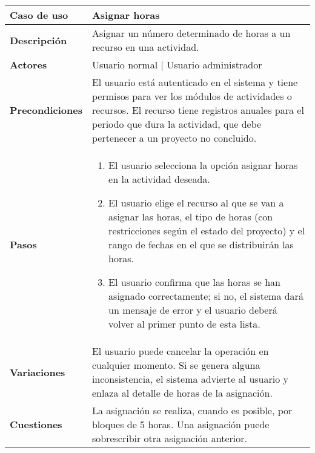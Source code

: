 \begin{tabular}{|p{1.25in}|p{3.65in}|}\hline
\textbf{Caso de uso} & \textbf{Asignar horas}\\\hline\hline
\textbf{Descripción} & Asignar un número determinado de horas a un recurso en
una actividad. \\\hline
\textbf{Actores} & Usuario normal | Usuario administrador\\\hline
\textbf{Precondiciones} & El usuario está autenticado en el sistema y
tiene permisos para ver los módulos de actividades o recursos. El
recurso tiene registros anuales para el periodo que dura la actividad,
que debe pertenecer a un proyecto no concluido.\\\hline
\textbf{Pasos} & 
  \begin{enumerate}
   \item El usuario selecciona la opción asignar horas en la actividad deseada.
   \item El usuario elige el recurso al que se van a asignar las horas, el
tipo de horas (con restricciones según el estado del proyecto) y el rango de
fechas en el que se distribuirán las horas.
   \item El usuario confirma que las horas se han asignado correctamente; si
no, el sistema dará un mensaje de error y el usuario deberá volver al primer
punto de esta lista.
  \end{enumerate}
\\\hline
\textbf{Variaciones} & El usuario puede cancelar la operación en
cualquier momento. Si se genera alguna inconsistencia, el sistema advierte al
usuario y enlaza al detalle de horas de la asignación.\\\hline
\textbf{Cuestiones} & La asignación se realiza, cuando es posible, por
bloques de 5 horas. Una asignación puede sobrescribir otra asignación
anterior. \\\hline
\end{tabular}

